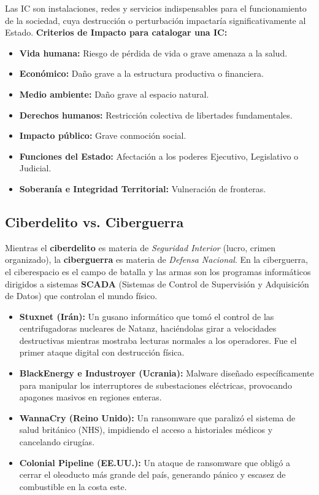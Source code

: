 \documentclass[11pt,a4paper]{article}
\begin{document}
\begin{infraestructura}
Las IC son instalaciones, redes y servicios indispensables para el funcionamiento de la sociedad, cuya destrucción o perturbación impactaría significativamente al Estado.
\textbf{Criterios de Impacto para catalogar una IC:}
\begin{itemize}[leftmargin=*]
  \item \textbf{Vida humana:} Riesgo de pérdida de vida o grave amenaza a la salud.
  \item \textbf{Económico:} Daño grave a la estructura productiva o financiera.
  \item \textbf{Medio ambiente:} Daño grave al espacio natural.
  \item \textbf{Derechos humanos:} Restricción colectiva de libertades fundamentales.
  \item \textbf{Impacto público:} Grave conmoción social.
  \item \textbf{Funciones del Estado:} Afectación a los poderes Ejecutivo, Legislativo o Judicial.
  \item \textbf{Soberanía e Integridad Territorial:} Vulneración de fronteras.
\end{itemize}
\end{infraestructura}

\subsection{Ciberdelito vs. Ciberguerra}
Mientras el \textbf{ciberdelito} es materia de \textit{Seguridad Interior} (lucro, crimen organizado), la \textbf{ciberguerra} es materia de \textit{Defensa Nacional}. En la ciberguerra, el ciberespacio es el campo de batalla y las armas son los programas informáticos dirigidos a sistemas \textbf{SCADA} (Sistemas de Control de Supervisión y Adquisición de Datos) que controlan el mundo físico.

\begin{ejemplo}
\begin{itemize}[leftmargin=*]
  \item \textbf{Stuxnet (Irán):} Un gusano informático que tomó el control de las centrifugadoras nucleares de Natanz, haciéndolas girar a velocidades destructivas mientras mostraba lecturas normales a los operadores. Fue el primer ataque digital con destrucción física.
  \item \textbf{BlackEnergy e Industroyer (Ucrania):} Malware diseñado específicamente para manipular los interruptores de subestaciones eléctricas, provocando apagones masivos en regiones enteras.
  \item \textbf{WannaCry (Reino Unido):} Un ransomware que paralizó el sistema de salud británico (NHS), impidiendo el acceso a historiales médicos y cancelando cirugías.
  \item \textbf{Colonial Pipeline (EE.UU.):} Un ataque de ransomware que obligó a cerrar el oleoducto más grande del país, generando pánico y escasez de combustible en la costa este.
\end{itemize}
\end{ejemplo}
\end{document}
